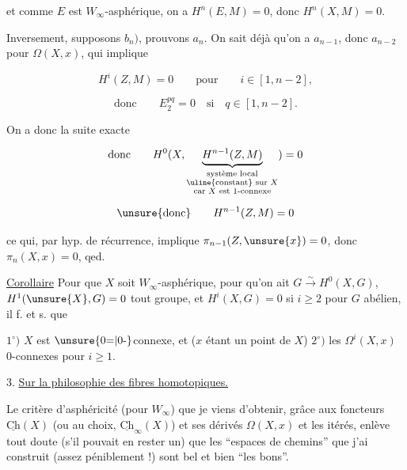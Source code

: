 et comme $E$ est $W_\infty$-asphérique, on a $H^n(E,M)=0$, donc $H^n(X,M)=0$.

Inversement, supposons $b_n)$, prouvons $a_n$. On sait déjà qu'on a $a_{n-1}$, donc $a_{n-2}$ pour $\Omega(X,x)$,  qui implique

\[
H^i(Z,M)=0\qquad\text{pour}\qquad i\in[1,n-2],
\]

\[
\text{donc}\qquad E^{pq}_2=0\quad\text{si}\quad q\in[1,n-2].
\]

On a donc la suite exacte


\[
\text{donc}\qquad H^0(X,\underbrace{H^{n-1}(Z,M)}_{\substack{\text{système local}\\\text{\uline{constant} sur }X\\\text{car }X\text{ est }1\text{-connexe}}})=0
\]

\[
\text{\unsure{donc}}\qquad H^{n-1}(Z,M)=0
\]

ce qui, par hyp. de récurrence, implique $\pi_{n-1}(Z,\unsure{x})=0$, donc $\pi_n(X,x)=0$, qed.

\uline{Corollaire} Pour que $X$ soit $W_\infty$-asphérique,  pour qu'on ait  $G\xrightarrow{\sim}H^0(X,G)$, $H^1(\unsure{X},G)=0$ tout groupe, et $H^i(X,G)=0$ si $i\geqslant 2$ pour $G$ abélien, il f. et s. que 

$1^\circ)$ $X$ est $\unsure{0{=}|0\text{-}}$connexe, et ($x$ étant un point de $X$) $2^\circ)$ les $\Omega^i(X,x)$ $0$-connexes pour $i\geqslant 1$.

3. \uline{Sur la philosophie des fibres homotopiques.}

 Le critère d'asphéricité (pour $W_\infty$) que je viens d'obtenir, grâce aux foncteurs $\underline{\mathrm{Ch}}(X)$ (ou au choix, $\underline{\mathrm{Ch}}_\infty(X)$) et ses dérivés $\Omega(X,x)$ et les itérés, enlève tout doute (s'il pouvait en rester un) que les  ``espaces de chemins'' que j'ai construit (assez péniblement !) sont bel et bien ``les bons''.

